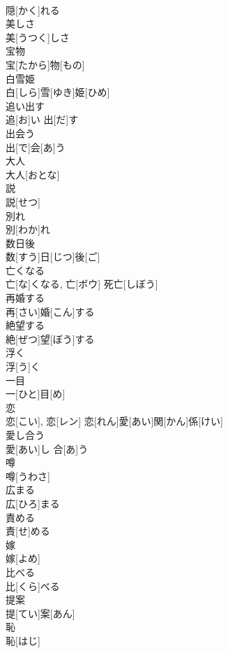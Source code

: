 \documentclass[8pt]{extreport}
\begin{document}
\begin{CJK}{UTF8}{min}
\\	隠[かく]れる	
\\	美しさ	
\\	美[うつく]しさ	
\\	宝物	
\\	宝[たから]物[もの]	
\\	白雪姫	
\\	白[しら]雪[ゆき]姫[ひめ]	
\\	追い出す	
\\	追[お]い 出[だ]す	
\\	出会う	
\\	出[で]会[あ]う	
\\	大人	
\\	大人[おとな]	
\\	説	
\\	説[せつ]	
\\	別れ	
\\	別[わか]れ	
\\	数日後	
\\	数[すう]日[じつ]後[ご]	
\\	亡くなる	
\\	亡[な]くなる, 亡[ボウ]	死亡[しぼう] 
\\	再婚する	
\\	再[さい]婚[こん]する	
\\	絶望する	
\\	絶[ぜつ]望[ぼう]する	
\\	浮く	
\\	浮[う]く	
\\	一目	
\\	一[ひと]目[め]	
\\	恋	
\\	恋[こい], 恋[レン]	恋[れん]愛[あい]関[かん]係[けい] 
\\	愛し合う	
\\	愛[あい]し 合[あ]う	
\\	噂	
\\	噂[うわさ]	
\\	広まる	
\\	広[ひろ]まる	
\\	責める	
\\	責[せ]める	
\\	嫁	
\\	嫁[よめ]	
\\	比べる	
\\	比[くら]べる	
\\	提案	
\\	提[てい]案[あん]	
\\	恥	
\\	恥[はじ]	

\end{CJK}
\end{document}
